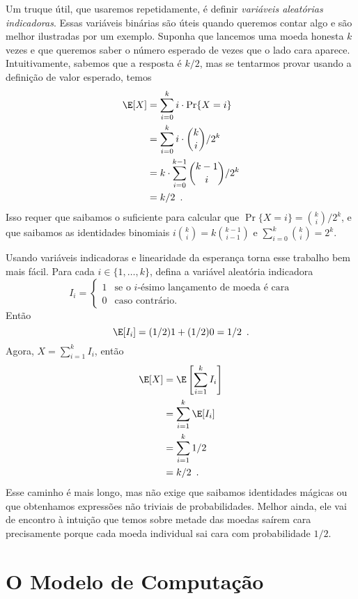 Um truque útil, que usaremos repetidamente, é definir \emph{variáveis aleatórias indicadoras}.
%
Essas variáveis binárias são úteis quando queremos contar algo e são melhor ilustradas por um exemplo. Suponha que lancemos uma moeda honesta $k$ vezes e que queremos saber o número esperado de vezes que o lado cara aparece.
%
Intuitivamente, sabemos que a resposta é $k/2$,
mas se tentarmos provar usando a definição de valor esperado, temos
\begin{align*}
   \E[X] & = \sum_{i=0}^k i\cdot\Pr\{X=i\} \\
         & = \sum_{i=0}^k i\cdot\binom{k}{i}/2^k \\
         & = k\cdot \sum_{i=0}^{k-1}\binom{k-1}{i}/2^k \\
         & = k/2 \enspace .
\end{align*}
Isso requer que saibamos o suficiente para calcular que $\Pr\{X=i\}
= \binom{k}{i}/2^k$, e que saibamos as identidades binomiais 
$i\binom{k}{i}=k\binom{k-1}{i-1}$ e $\sum_{i=0}^{k} \binom{k}{i} = 2^{k}$.

Usando variáveis indicadoras e linearidade da esperança torna esse trabalho bem mais fácil. Para cada
$i\in\{1,\ldots,k\}$, defina a variável aleatória indicadora 
\[
    I_i = \begin{cases}
           1 & \text{se o $i$-ésimo lançamento de moeda é cara} \\
           0 & \text{caso contrário.}
          \end{cases}
\]
Então
\[ \E[I_i] = (1/2)1 + (1/2)0 = 1/2 \enspace . \]
Agora, $X=\sum_{i=1}^k I_i$, então
\begin{align*}
   \E[X] & = \E\left[\sum_{i=1}^k I_i\right] \\
         & = \sum_{i=1}^k \E[I_i] \\
         & = \sum_{i=1}^k 1/2 \\
         & = k/2 \enspace .
\end{align*}
Esse caminho é mais longo, mas não exige que saibamos identidades mágicas ou que obtenhamos expressões não triviais de probabilidades. Melhor ainda, 
ele vai de encontro à intuição que temos sobre metade das moedas saírem cara precisamente porque cada moeda individual sai cara com probabilidade $1/2$.

\section{O Modelo de Computação}

